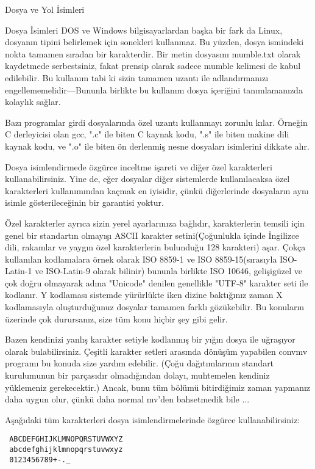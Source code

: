 \documentclass[10pt,a5paper]{book}
\begin{document}
\begin{section}{Dosya ve Yol İsimleri}
\begin{subsection}{Dosya İsimleri}
	DOS ve Windows bilgisayarlardan başka bir fark da Linux, dosyanın tipini belirlemek için sonekleri kullanmaz. Bu yüzden, dosya ismindeki nokta tamamen sıradan bir karakterdir. Bir metin dosyasını mumble.txt olarak kaydetmede serbestsiniz, fakat prensip olarak sadece mumble kelimesi de  kabul edilebilir. Bu kullanım tabi ki sizin tamamen uzantı ile adlandırmanızı engellememelidir—Bununla birlikte bu kullanım dosya içeriğini tanımlamanızda kolaylık sağlar.
	
	Bazı programlar girdi dosyalarında özel uzantı kullanmayı zorunlu kılar. Örneğin C derleyicisi olan gcc, ".c" ile biten C kaynak kodu, ".s" ile biten makine dili kaynak kodu, ve ".o" ile biten ön derlenmiş nesne dosyaları isimlerini dikkate alır.
	
	Dosya isimlendirmede özgürce inceltme işareti ve diğer özel karakterleri kullanabilirsiniz. Yine de, eğer dosyalar diğer sistemlerde kullanılacaksa özel karakterleri kullanımından kaçmak en iyisidir, çünkü diğerlerinde dosyaların aynı isimle gösterileceğinin bir garantisi yoktur.
	
	Özel karakterler ayrıca sizin yerel ayarlarınıza bağlıdır, karakterlerin temsili için genel bir standartın olmayışı ASCII karakter setini(Çoğunlukla içinde İngilizce dili, rakamlar ve yaygın özel karakterlerin bulunduğu 128 karakteri) aşar. Çokça kullanılan kodlamalara örnek olarak ISO 8859-1 ve ISO 8859-15(sırasıyla ISO-Latin-1 ve ISO-Latin-9 olarak bilinir) bununla birlikte ISO 10646, gelişigüzel ve çok doğru olmayarak adına "Unicode" denilen genellikle "UTF-8" karakter seti ile kodlanır. Y kodlaması sistemde yürürlükte iken dizine baktığınız zaman X kodlamasıyla oluşturduğunuz dosyalar tamamen farklı gözükebilir. Bu konuların üzerinde çok durursanız, size tüm konu hiçbir şey gibi gelir.
	
	Bazen kendinizi yanlış karakter setiyle kodlanmış bir yığın dosya ile uğraşıyor olarak bulabilirsiniz. Çeşitli karakter setleri arasında dönüşüm yapabilen convmv programı bu konuda size yardım edebilir. (Çoğu dağıtımlarının standart kurulumunun bir parçasıdır olmadığından dolayı, muhtemelen kendiniz yüklemeniz gerekecektir.) Ancak, bunu tüm bölümü bitirdiğimiz zaman yapmanız daha uygun olur, çünkü daha normal mv'den bahsetmedik bile ...
	
Aşağıdaki tüm karakterleri dosya isimlendirmelerinde özgürce kullanabilirsiniz:
\begin{verbatim}
 ABCDEFGHIJKLMNOPQRSTUVWXYZ
 abcdefghijklmnopqrstuvwxyz
 0123456789+-._
\end{verbatim}


\end{subsection}
\end{section}
\end{document}
